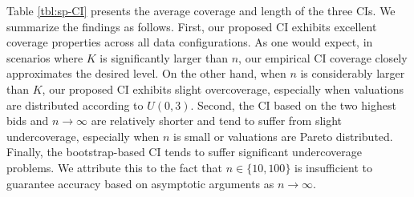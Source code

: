 Table \ref{tbl:sp-CI} presents the average coverage and length of the three CIs. %
We summarize the findings as follows. First, our proposed CI exhibits excellent coverage properties across all data configurations. As one would expect, in scenarios where $K$ is significantly larger than $n$, our empirical CI coverage closely approximates the desired level. On the other hand, when $n$ is considerably larger than $K$, our proposed CI exhibits slight overcoverage, especially when valuations are distributed according to $U(0,3)$. Second, the CI based on the two highest bids and $n\to \infty$ are relatively shorter and tend to suffer from slight undercoverage, especially when $n$ is small or valuations are Pareto distributed. Finally, the bootstrap-based CI tends to suffer significant undercoverage problems. We attribute this to the fact that $n \in \{10,100\}$ is insufficient to guarantee accuracy based on asymptotic arguments as $n\to\infty$.


